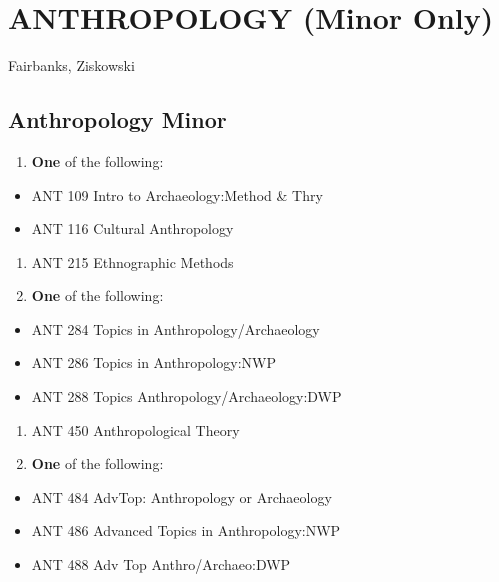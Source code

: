 \documentclass[
  letterpaper,
]{scrbook}
\providecommand{\tightlist}{%
  \setlength{\itemsep}{0pt}\setlength{\parskip}{0pt}}
\begin{document}
\section{ANTHROPOLOGY (Minor Only)}\label{anthropology-minor-only}

Fairbanks, Ziskowski

\subsection{Anthropology Minor}\label{anthropology-minor}

\begin{enumerate}
\def\labelenumi{\arabic{enumi}.}
\tightlist
\item
  \textbf{One} of the following:
\end{enumerate}

\begin{itemize}
\tightlist
\item
  ANT 109 Intro to Archaeology:Method \& Thry
\item
  ANT 116 Cultural Anthropology
\end{itemize}

\begin{enumerate}
\def\labelenumi{\arabic{enumi}.}
\setcounter{enumi}{1}
\tightlist
\item
  ANT 215 Ethnographic Methods
\item
  \textbf{One} of the following:
\end{enumerate}

\begin{itemize}
\tightlist
\item
  ANT 284 Topics in Anthropology/Archaeology
\item
  ANT 286 Topics in Anthropology:NWP
\item
  ANT 288 Topics Anthropology/Archaeology:DWP
\end{itemize}

\begin{enumerate}
\def\labelenumi{\arabic{enumi}.}
\setcounter{enumi}{3}
\tightlist
\item
  ANT 450 Anthropological Theory
\item
  \textbf{One} of the following:
\end{enumerate}

\begin{itemize}
\tightlist
\item
  ANT 484 AdvTop: Anthropology or Archaeology
\item
  ANT 486 Advanced Topics in Anthropology:NWP
\item
  ANT 488 Adv Top Anthro/Archaeo:DWP
\end{itemize}
\end{document}
